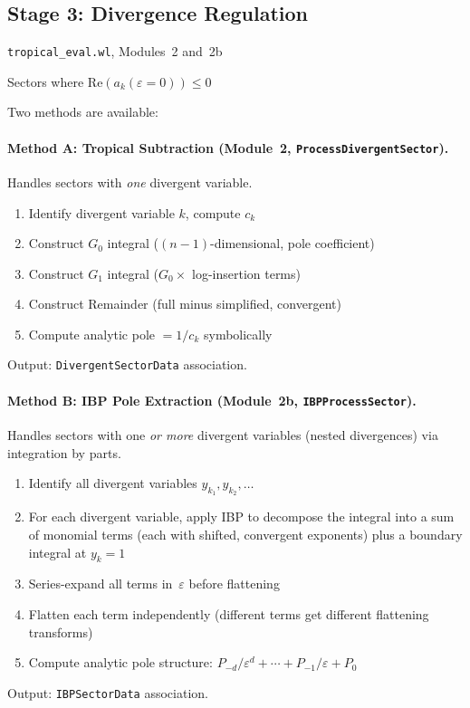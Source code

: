 \documentclass[11pt,a4paper]{article}
\begin{document}
\subsection{Stage 3: Divergence Regulation}
\begin{description}[style=nextline]
  \item[Source:] \texttt{tropical\_eval.wl}, Modules~2 and~2b
  \item[Input:] Sectors where $\mathrm{Re}(a_k(\varepsilon{=}0)) \leq 0$
  \item[Process:] Two methods are available:
\end{description}

\paragraph{Method A: Tropical Subtraction (Module~2, \texttt{ProcessDivergentSector}).}
Handles sectors with \emph{one} divergent variable.
    \begin{enumerate}[label=(\alph*)]
      \item Identify divergent variable $k$, compute $c_k$
      \item Construct $G_0$ integral ($(n{-}1)$-dimensional, pole coefficient)
      \item Construct $G_1$ integral ($G_0 \times$ log-insertion terms)
      \item Construct Remainder (full minus simplified, convergent)
      \item Compute analytic pole $= 1/c_k$ symbolically
    \end{enumerate}
    Output: \texttt{DivergentSectorData} association.

\paragraph{Method B: IBP Pole Extraction (Module~2b, \texttt{IBPProcessSector}).}
Handles sectors with one \emph{or more} divergent variables (nested divergences) via integration by parts.
    \begin{enumerate}[label=(\alph*)]
      \item Identify all divergent variables $y_{k_1}, y_{k_2}, \ldots$
      \item For each divergent variable, apply IBP to decompose the integral into a sum of monomial terms (each with shifted, convergent exponents) plus a boundary integral at $y_k = 1$
      \item Series-expand all terms in~$\varepsilon$ before flattening
      \item Flatten each term independently (different terms get different flattening transforms)
      \item Compute analytic pole structure: $P_{-d}/\varepsilon^d + \cdots + P_{-1}/\varepsilon + P_0$
    \end{enumerate}
    Output: \texttt{IBPSectorData} association.
\end{document}
